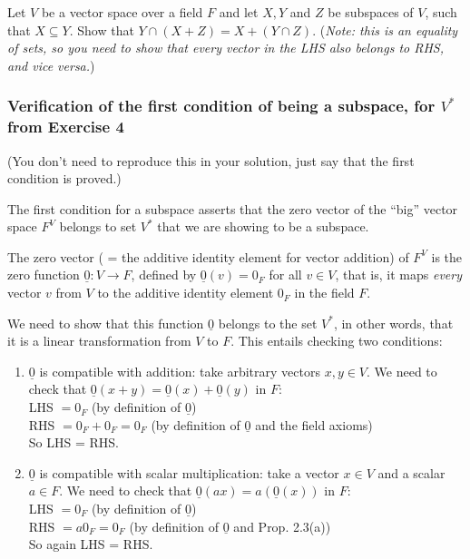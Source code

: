\documentclass[
  12pt,
  a4paper,
  twoside]{article}
\theoremstyle{plain}
\theoremstyle{definition}
\begin{document}
Let \(V\) be a vector space over a field \(F\) and let \(X, Y\) and \(Z\) be subspaces
of \(V\), such that \(X\subseteq Y\). Show that \(Y\cap(X+Z) = X+(Y\cap Z)\).
(\emph{Note: this is an equality of sets, so you need to show that every vector
in the LHS also belongs to RHS, and vice versa.})

\hypertarget{verification-of-the-first-condition-of-being-a-subspace-for-v-from-exercise-4}{%
\subsubsection*{\texorpdfstring{Verification of the first condition of being a subspace, for \(V^*\) from Exercise 4}{Verification of the first condition of being a subspace, for V\^{}* from Exercise 4}}\label{verification-of-the-first-condition-of-being-a-subspace-for-v-from-exercise-4}}

(You don't need to reproduce this in your solution, just say that the first condition is proved.)

The first condition for a subspace asserts that the zero vector of the ``big''
vector space \(F^V\) belongs to set \(V^*\) that we are showing to be a subspace.

The zero vector ( = the additive identity element for vector addition) of \(F^V\)
is the zero function \(\underline{0}:V\to F\), defined by \(\underline{0}(v)=0_F\) for
all \(v\in V\), that is, it maps \emph{every} vector \(v\) from \(V\) to the additive
identity element \(0_F\) in the field \(F\).

We need to show that this function \(\underline{0}\) belongs to the set \(V^*\), in
other words, that it is a linear transformation from \(V\) to \(F\). This entails
checking two conditions:

\begin{enumerate}
\def\labelenumi{(\alph{enumi})}
\item
  \(\underline0\) is compatible with addition: take arbitrary vectors \(x,y\in V\). We need to check that \(\underline0(x+y)=\underline0(x)+\underline0(y)\) in \(F\):\\
  LHS \(= 0_F\) (by definition of \(\underline0\))\\
  RHS \(= 0_F+0_F = 0_F\) (by definition of \(\underline0\) and the field axioms)\\
  So LHS = RHS.
\item
  \(\underline0\) is compatible with scalar multiplication: take a vector \(x\in V\) and a scalar \(a\in F\). We need to check that \(\underline0(ax)=a(\underline{0}(x))\) in \(F\):\\
  LHS \(= 0_F\) (by definition of \(\underline{0}\))\\
  RHS \(= a0_F = 0_F\) (by definition of \(\underline0\) and Prop. 2.3(a))\\
  So again LHS = RHS.
\end{enumerate}
\end{document}
